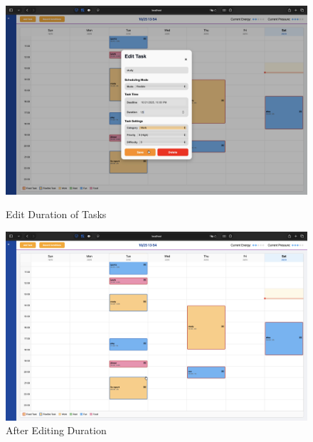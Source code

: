 \documentclass[12pt, a4paper]{article}
\begin{document}
\begin{enumerate}
                    \begin{figure}[H]
                        \begin{minipage}[t]{0.49\textwidth}
                            \centering
                            \includegraphics[width=\textwidth]{Images/System/timetable/change_duration.png}
                            \caption{Edit Duration of Tasks}
                            \label{change_duration}
                        \end{minipage}
                        \hfill
                        \begin{minipage}[t]{0.49\textwidth}
                            \centering
                            \includegraphics[width=\textwidth]{Images/System/timetable/aft_change_duration.png}
                            \caption{After Editing Duration}
                            \label{aft_change_duration}
                        \end{minipage}
                    \end{figure}


\end{enumerate}
\end{document}
